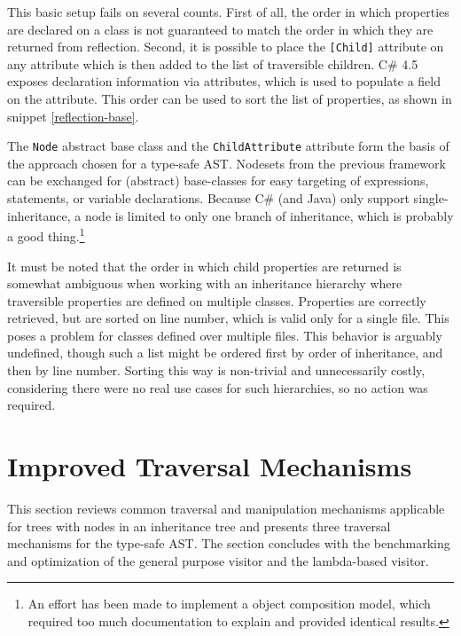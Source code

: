 \documentclass[twoside,openright]{uva-bachelor-thesis}
\newcommand{\code}[1]{\texttt{\footnotesize#1}}
\begin{document}
		This basic setup fails on several counts. First of all, the order in which properties are declared on a class is not guaranteed to match the order in which they are returned from reflection. Second, it is possible to place the \code{[Child]} attribute on any attribute which is then added to the list of traversible children. C\# 4.5 exposes declaration information via attributes, which is used to populate a field on the attribute. This order can be used to sort the list of properties, as shown in snippet \ref{reflection-base}.
				
		The \code{Node} abstract base class and the \code{ChildAttribute} attribute form the basis of the approach chosen for a type-safe AST. Nodesets from the previous framework can be exchanged for (abstract) base-classes for easy targeting of expressions, statements, or variable declarations. Because C\# (and Java) only support single-inheritance, a node is limited to only one branch of inheritance, which is probably a good thing.\footnote{An effort has been made to implement a object composition model, which required too much documentation to explain and provided identical results.}
	
		It must be noted that the order in which child properties are returned is somewhat ambiguous when working with an inheritance hierarchy where traversible properties are defined on multiple classes. Properties are correctly retrieved, but are sorted on line number, which is valid only for a single file. This poses a problem for classes defined over multiple files. This behavior is arguably undefined, though such a list might be ordered first by order of inheritance, and then by line number. Sorting this way is non-trivial and unnecessarily costly, considering there were no real use cases for such hierarchies, so no action was required.
					
	\section{Improved Traversal Mechanisms}
		This section reviews common traversal and manipulation mechanisms applicable for trees with nodes in an inheritance tree and presents three traversal mechanisms for the type-safe AST. The section concludes with the benchmarking and optimization of the general purpose visitor and the lambda-based visitor. 
				
\end{document}

